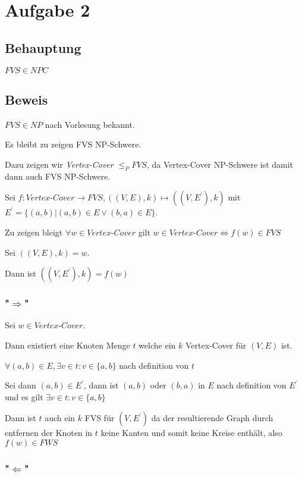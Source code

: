 \section*{Aufgabe 2}

\subsection*{Behauptung}

$FVS \in NPC$

\subsection*{Beweis}

$FVS \in NP$ nach Vorlesung bekannt.

Es bleibt zu zeigen FVS NP-Schwere.

Dazu zeigen wir \textit{Vertex-Cover} $\leq_P FVS$,
da Vertex-Cover NP-Schwere ist damit dann auch FVS NP-Schwere.

Sei $f: \textit{Vertex-Cover} \to FVS, ((V,E),k) \mapsto ((V,E^\prime),k)$ mit
 $E^\prime = \{(a,b) | (a,b) \in E \vee (b,a) \in E  \}$.
 
Zu zeigen bleigt $\forall w \in \textit{Vertex-Cover}$ gilt
$w \in \textit{Vertex-Cover} \Leftrightarrow f(w) \in FVS$

Sei $((V,E),k) =  w$.

Dann ist $((V,E^\prime),k) = f(w)$

\subsubsection*{"$\Rightarrow$"}
Sei $w \in \textit{Vertex-Cover}$.

Dann existiert eine Knoten Menge $t$ welche ein $k$ Vertex-Cover für $(V,E)$ ist.

$\forall (a,b) \in E, \exists v \in t: v \in \{a,b\}$ nach definition von $t$

Sei dann $(a,b) \in E^\prime$, dann ist $(a,b)$ oder $(b,a)$ 
in $E$ nach definition von $E^\prime$ und es gilt $\exists v \in t : v \in \{a,b\}$

Dann ist $t$ auch ein $k$ FVS für $(V,E^\prime)$ da der resultierende Graph durch entfernen der Knoten in $t$ keine Kanten und somit keine Kreise enthält, also $f(w) \in FWS$


\subsubsection*{"$\Leftarrow$"}


